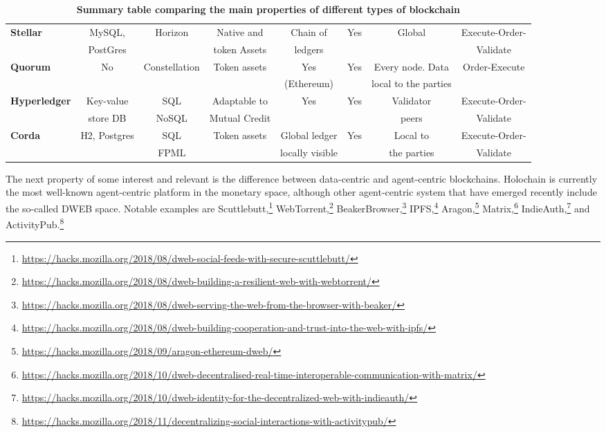 \begin{table}
\begin{centering}
{\begin{tabular}{| l | c | c | c | c | c | c | c |}
\textbf{Stellar}		&MySQL,		&Horizon			&Native and
				&Chain of		&Yes				&Global			&Execute-Order-\\
				&PostGres	&				&token Assets 
				&ledgers		&				&				&Validate\\
\hline
\textbf{Quorum} 	&No			&Constellation		&Token assets 
				&Yes			&Yes				&Every node. Data	&Order-Execute\\
			 	&			&				& 
				&(Ethereum) 	&				&local to the parties		& \\
\hline
\textbf{Hyperledger}	&Key-value	&SQL			&Adaptable to
				&Yes			&Yes				&Validator				&Execute-Order-\\
 				&store DB		&NoSQL			&Mutual Credit
				&			&				&peers				&Validate \\
\hline
\textbf{Corda} 		&H2, Postgres	&SQL			&Token assets 
				&Global ledger	&Yes				&Local to				&Execute-Order-\\
		 		&			&FPML			&
				&locally visible 	&				&the parties			&Validate \\
\hline
\end{tabular}}
\caption{\bf \small Summary table comparing the main properties of different types of blockchain}
\label{blockchain_types1}
\end{centering}
\vspace{-0.3cm}
\end{table}

The next property of some interest and relevant is the difference between data-centric and agent-centric blockchains. Holochain is currently the most well-known agent-centric platform in the monetary space, although other agent-centric system that have emerged recently include the so-called DWEB space. Notable examples are
Scuttlebutt,\footnote{\url{https://hacks.mozilla.org/2018/08/dweb-social-feeds-with-secure-scuttlebutt/}}
WebTorrent,\footnote{\url{https://hacks.mozilla.org/2018/08/dweb-building-a-resilient-web-with-webtorrent/}}
BeakerBrowser,\footnote{\url{https://hacks.mozilla.org/2018/08/dweb-serving-the-web-from-the-browser-with-beaker/}}
IPFS,\footnote{\url{https://hacks.mozilla.org/2018/08/dweb-building-cooperation-and-trust-into-the-web-with-ipfs/}}
Aragon,\footnote{\url{https://hacks.mozilla.org/2018/09/aragon-ethereum-dweb/}}
Matrix,\footnote{\url{https://hacks.mozilla.org/2018/10/dweb-decentralised-real-time-interoperable-communication-with-matrix/}}
IndieAuth,\footnote{\url{https://hacks.mozilla.org/2018/10/dweb-identity-for-the-decentralized-web-with-indieauth/}}
and ActivityPub.\footnote{\url{https://hacks.mozilla.org/2018/11/decentralizing-social-interactions-with-activitypub/}}

